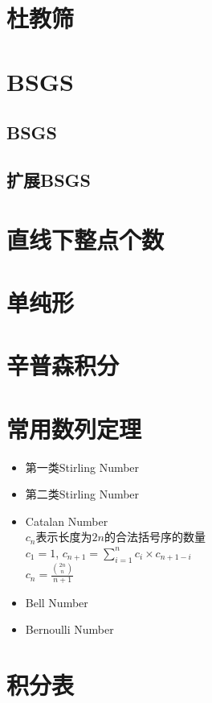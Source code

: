 \section{杜教筛}
\section{BSGS}
\subsection{BSGS}
\subsection{扩展BSGS}
\section{直线下整点个数}
\section{单纯形}
\section{辛普森积分}
\section{常用数列定理}
\begin{itemize}
	\item 第一类Stirling Number
	\item 第二类Stirling Number
	\item Catalan Number\\$ c_n $表示长度为$ 2n $的合法括号序的数量\\$ c_1 = 1 $, $ c_{n+1} = \sum\limits_{i=1}^{n} c_i \times c_{n + 1 - i} $\\$ c_n = \frac{\binom{2n}{n}}{n + 1} $
	\item Bell Number
	\item Bernoulli Number
\end{itemize}
\section{积分表}